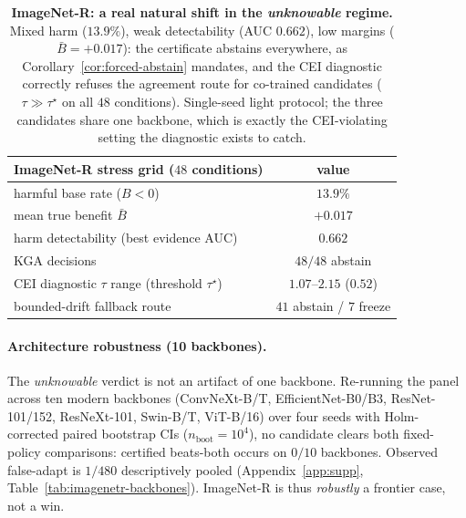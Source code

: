 \documentclass[conference]{IEEEtran}
\theoremstyle{plain}
\theoremstyle{definition}
\begin{document}
\begin{table}[tb]\centering\small
{%
\begin{tabular}{lc}
\toprule
ImageNet-R stress grid ($48$ conditions) & value \\
\midrule
harmful base rate ($B<0$)                       & $13.9\%$ \\
mean true benefit $\bar B$                      & $+0.017$ \\
harm detectability (best evidence AUC)          & $0.662$ \\
\textsc{KGA} decisions                          & $48/48$ abstain \\
CEI diagnostic $\tau$ range (threshold $\tau^\star$) & $1.07$--$2.15$ ($0.52$) \\
bounded-drift fallback route                    & $41$ abstain / $7$ freeze \\
\bottomrule
\end{tabular}}
\caption{\textbf{ImageNet-R: a real natural shift in the \emph{unknowable} regime.}
Mixed harm ($13.9\%$), weak detectability (AUC $0.662$), low margins
($\bar B{=}{+}0.017$): the certificate abstains everywhere, as
Corollary~\ref{cor:forced-abstain} mandates, and the CEI diagnostic correctly refuses
the agreement route for co-trained candidates ($\tau\gg\tau^\star$ on all $48$
conditions). Single-seed light protocol; the three candidates share one backbone, which
is exactly the CEI-violating setting the diagnostic exists to catch.}
\label{tab:imagenetr}
\end{table}

\paragraph{Architecture robustness (10 backbones).} The \emph{unknowable} verdict is not an
artifact of one backbone. Re-running the panel across ten modern backbones (ConvNeXt-B/T,
EfficientNet-B0/B3, ResNet-101/152, ResNeXt-101, Swin-B/T, ViT-B/16) over four seeds with
Holm-corrected paired bootstrap CIs ($n_{\mathrm{boot}}{=}10^4$), no candidate clears both
fixed-policy comparisons: certified beats-both occurs on $0/10$ backbones. Observed false-adapt is
$1/480$ descriptively pooled (Appendix~\ref{app:supp}, Table~\ref{tab:imagenetr-backbones}).
ImageNet-R is thus \emph{robustly} a frontier case, not a win.
\end{document}
